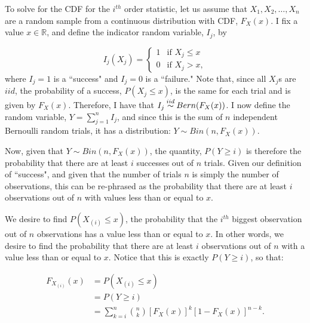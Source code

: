 \begin{problem}{9}  To solve for the CDF for the $i^{th}$ order statistic, let us assume that $X_1, X_2, \ldots, X_n$ are a random sample from a continuous distribution with CDF, $F_X(x)$.  I fix a value $x \in \mathbb R$, and define the indicator random variable, $I_j$, by

\[
  I_j(X_j) =
  \begin{cases}
                                   1 & \text{if $X_j \le x$} \\
                                   0 & \text{if $X_j > x$},
  \end{cases}
\]
where $I_j =1 $ is a ``success" and $I_j=0$ is a ``failure."  Note that, since all $X_j$s are $iid$, the probability of a success, $P(X_j \le x)$, is the same for each trial and is given by $F_X(x)$.  Therefore, I have that $I_j \distas{iid} Bern(F_X(x))$.  I now define the random variable, $Y = \sum_{j=1}^n I_j$, and since this is the sum of $n$ independent Bernoulli random trials, it has a distribution: $Y \sim Bin(n, F_X(x))$.

Now, given that $Y \sim Bin(n, F_X(x))$, the quantity, $P(Y \ge i)$ is therefore the probability that there are at least $i$ successes out of $n$ trials.  Given our definition of ``success", and given that the number of trials $n$ is simply the number of observations, this can be re-phrased as the probability that there are at least $i$ observations out of $n$ with values less than or equal to $x$.

We desire to find $P(X_{(i)} \le x)$, the probability that the $i^{th}$ biggest observation out of $n$ observations has a value less than or equal to $x$.  In other words, we desire to find the probability that there are at least $i$ observations out of $n$ with a value less than or equal to $x$.  Notice that this is exactly $P(Y \ge i)$, so that:

\begin{align*}
F_{X_{(i)}}(x) &= P(X_{(i)} \le x) \\
& = P(Y \ge i) \\
& = \sum_{k=i}^n \binom{n}{k} [F_X(x)]^k [1-F_X(x)]^{n-k}.
\end{align*}

\end{problem}



